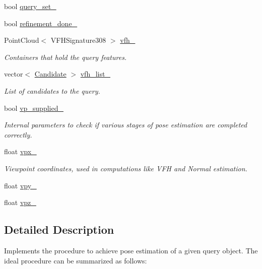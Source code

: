 \begin{DoxyCompactItemize}
bool \hyperlink{classPoseEstimation_a7e544a41181063a42466cab3bdaf7566}{query\-\_\-set\-\_\-}
\item 
bool \hyperlink{classPoseEstimation_a2a2d2fea36860191501e5b709df102cc}{refinement\-\_\-done\-\_\-}
\item 
Point\-Cloud$<$ V\-F\-H\-Signature308 $>$ \hyperlink{classPoseEstimation_aa5b8629653546950dfc66147f3df29a7}{vfh\-\_\-}
\begin{DoxyCompactList}\small\item\em Containers that hold the query features. \end{DoxyCompactList}\item 
vector$<$ \hyperlink{classCandidate}{Candidate} $>$ \hyperlink{classPoseEstimation_ac75bed8cd5eea4f58b3c68336801977a}{vfh\-\_\-list\-\_\-}
\begin{DoxyCompactList}\small\item\em List of candidates to the query. \end{DoxyCompactList}\item 
bool \hyperlink{classPoseEstimation_a1e1d26efa152cca49892e2458f0e5842}{vp\-\_\-supplied\-\_\-}
\begin{DoxyCompactList}\small\item\em Internal parameters to check if various stages of pose estimation are completed correctly. \end{DoxyCompactList}\item 
float \hyperlink{classPoseEstimation_ab9e6a36597bef9a8f3a831423bdae1c9}{vpx\-\_\-}
\begin{DoxyCompactList}\small\item\em Viewpoint coordinates, used in computations like V\-F\-H and Normal estimation. \end{DoxyCompactList}\item 
float \hyperlink{classPoseEstimation_a1511fe49165c547efae9bed1b2353d07}{vpy\-\_\-}
\item 
float \hyperlink{classPoseEstimation_a49696bc81ba72d1b0e985aa8318b0a82}{vpz\-\_\-}
\end{DoxyCompactItemize}


\subsection{Detailed Description}
Implements the procedure to achieve pose estimation of a given query object. The ideal procedure can be summarized as follows\-: 


